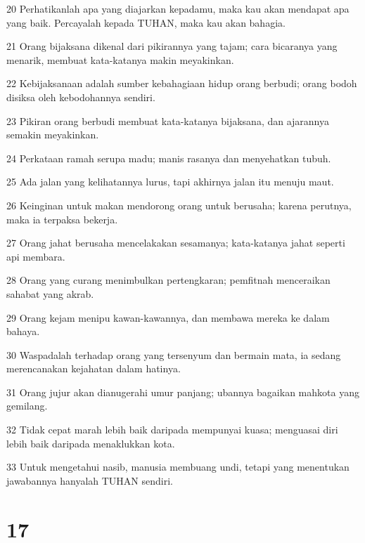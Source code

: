 \par 20 Perhatikanlah apa yang diajarkan kepadamu, maka kau akan mendapat apa yang baik. Percayalah kepada TUHAN, maka kau akan bahagia.
\par 21 Orang bijaksana dikenal dari pikirannya yang tajam; cara bicaranya yang menarik, membuat kata-katanya makin meyakinkan.
\par 22 Kebijaksanaan adalah sumber kebahagiaan hidup orang berbudi; orang bodoh disiksa oleh kebodohannya sendiri.
\par 23 Pikiran orang berbudi membuat kata-katanya bijaksana, dan ajarannya semakin meyakinkan.
\par 24 Perkataan ramah serupa madu; manis rasanya dan menyehatkan tubuh.
\par 25 Ada jalan yang kelihatannya lurus, tapi akhirnya jalan itu menuju maut.
\par 26 Keinginan untuk makan mendorong orang untuk berusaha; karena perutnya, maka ia terpaksa bekerja.
\par 27 Orang jahat berusaha mencelakakan sesamanya; kata-katanya jahat seperti api membara.
\par 28 Orang yang curang menimbulkan pertengkaran; pemfitnah menceraikan sahabat yang akrab.
\par 29 Orang kejam menipu kawan-kawannya, dan membawa mereka ke dalam bahaya.
\par 30 Waspadalah terhadap orang yang tersenyum dan bermain mata, ia sedang merencanakan kejahatan dalam hatinya.
\par 31 Orang jujur akan dianugerahi umur panjang; ubannya bagaikan mahkota yang gemilang.
\par 32 Tidak cepat marah lebih baik daripada mempunyai kuasa; menguasai diri lebih baik daripada menaklukkan kota.
\par 33 Untuk mengetahui nasib, manusia membuang undi, tetapi yang menentukan jawabannya hanyalah TUHAN sendiri.

\chapter{17}

